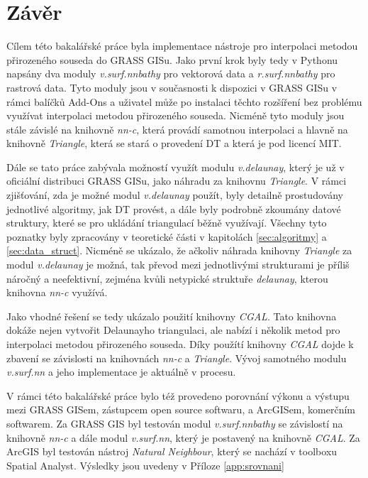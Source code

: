 \documentclass[12pt,a4paper]{article}
\begin{document}
\newpage
\section{Závěr}
Cílem této bakalářské práce byla implementace nástroje pro interpolaci metodou přirozeného souseda do GRASS GISu. Jako první krok byly tedy v Pythonu napsány dva moduly \emph{v.surf.nnbathy} pro vektorová data a \emph{r.surf.nnbathy} pro rastrová data. Tyto moduly jsou v současnosti k dispozici v GRASS GISu v rámci balíčků Add-Ons a uživatel může po instalaci těchto rozšíření bez problému využívat interpolaci metodou přirozeného souseda. Nicméně tyto moduly jsou stále závislé na knihovně \emph{nn-c}, která provádí samotnou interpolaci a hlavně na knihovně \emph{Triangle}, která se stará o provedení DT a která je pod licencí MIT.

Dále se tato práce zabývala možností využít modulu \emph{v.delaunay}, který je už v oficiální distribuci GRASS GISu, jako náhradu za knihovnu \emph{Triangle}. V rámci zjišťování, zda je možné modul \emph{v.delaunay} použít, byly detailně prostudovány jednotlivé algoritmy, jak DT provést, a dále byly podrobně zkoumány datové struktury, které se pro ukládání triangulací běžně využívají. Všechny tyto poznatky byly zpracovány v teoretické části v kapitolách \ref{sec:algoritmy} a \ref{sec:data_struct}. Nicméně se ukázalo, že ačkoliv náhrada knihovny \emph{Triangle} za modul \emph{v.delaunay} je možná, tak převod mezi jednotlivými strukturami je příliš náročný a neefektivní, zejména kvůli netypické struktuře \emph{delaunay}, kterou knihovna \emph{nn-c} využívá.

Jako vhodné řešení se tedy ukázalo použití knihovny \emph{CGAL}. Tato knihovna dokáže nejen vytvořit Delaunayho triangulaci, ale nabízí i několik metod pro interpolaci metodou přirozeného souseda. Díky použítí knihovny \emph{CGAL} dojde k zbavení se závislosti na knihovnách \emph{nn-c} a \emph{Triangle}. Vývoj samotného modulu \emph{v.surf.nn} a jeho implementace je aktuálně v procesu.

V rámci této bakalářské práce bylo též provedeno porovnání výkonu a výstupu mezi GRASS GISem, zástupcem open source softwaru, a ArcGISem, komerčním softwarem. Za GRASS GIS byl testován modul \emph{v.surf.nnbathy} se závislostí na knihovně \emph{nn-c} a dále modul \emph{v.surf.nn}, který je postavený na knihovně \emph{CGAL}. Za ArcGIS byl testován nástroj \emph{Natural Neighbour}, který se nachází v toolboxu Spatial Analyst. Výsledky jsou uvedeny v Příloze \ref{app:srovnani}
\end{document}
